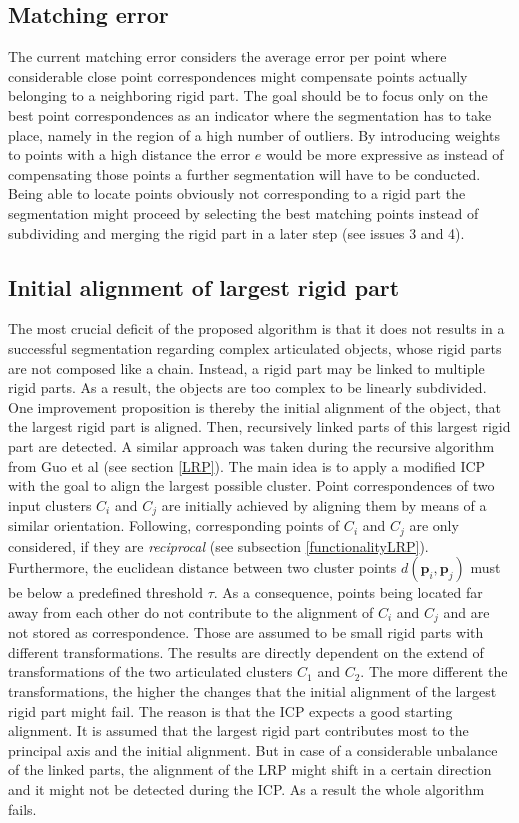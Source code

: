 \subsection{Matching error}
The current matching error considers the average error per point where considerable close point correspondences might compensate points actually belonging to a neighboring rigid part. The goal should be to focus only on the best point correspondences as an indicator where the segmentation has to take place, namely in the region of a high number of outliers. By introducing weights to points with a high distance the error $e$ would be more expressive as instead of compensating those points a further segmentation will have to be conducted. Being able to locate points obviously not corresponding to a rigid part the segmentation might proceed by selecting the best matching points instead of subdividing and merging the rigid part in a later step (see issues 3 and 4).

\subsection{Initial alignment of largest rigid part}
The most crucial deficit of the proposed algorithm is that it does not results in a successful segmentation regarding complex articulated objects, whose rigid parts are not composed like a chain. Instead, a rigid part may be linked to multiple rigid parts. As a result, the objects are too complex to be linearly subdivided. One improvement proposition is thereby the initial alignment of the object, that the largest rigid part is aligned. Then, recursively linked parts of this largest rigid part are detected. A similar approach was taken during the recursive algorithm from Guo et al \cite{guo2016correspondence} (see section \ref{LRP}). The main idea is to apply a modified ICP with the goal to align the largest possible cluster. Point correspondences of two input clusters $C_i$ and $C_j$ are initially achieved by aligning them by means of a similar orientation. Following, corresponding points of $C_i$ and $C_j$ are only considered, if they are \textit{reciprocal} (see subsection \ref{functionalityLRP}). Furthermore, the euclidean distance between two cluster points $d(\boldsymbol{p}_i,\boldsymbol{p}_j)$ must be below a predefined threshold $\tau$. As a consequence, points being located far away from each other do not contribute to the alignment of $C_i$ and $C_j$ and are not stored as correspondence. Those are assumed to be small rigid parts with different transformations. The results are directly dependent on the extend of transformations of the two articulated clusters $C_1$ and $C_2$. The more different the transformations, the higher the changes that the initial alignment of the largest rigid part might fail. The reason is that the ICP expects a good starting alignment. It is assumed that the largest rigid part contributes most to the principal axis and the initial alignment. But in case of a considerable unbalance of the linked parts, the alignment of the LRP might shift in a certain direction and it might not be detected during the ICP. As a result the whole algorithm fails.

